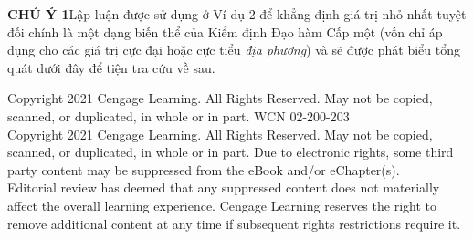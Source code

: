 \documentclass[11pt]{article}
\begin{document}
\begin{minipage}[t]{0.725\textwidth}
  \vspace{16pt}
  \noindent
  \textbf{\textsf{\color{stewartcyan}CHÚ Ý 1}}\quad Lập luận được sử dụng ở Ví dụ 2 để khẳng định giá trị nhỏ nhất tuyệt đối chính là một dạng biến thể của Kiểm định Đạo hàm Cấp một (vốn chỉ áp dụng cho các giá trị cực đại hoặc cực tiểu \textit{địa phương}) và sẽ được phát biểu tổng quát dưới đây để tiện tra cứu về sau.
\end{minipage}

\vfill
\noindent
{\fontsize{6.5}{8}\selectfont \color{stewartdarkgray}
Copyright 2021 Cengage Learning. All Rights Reserved. May not be copied, scanned, or duplicated, in whole or in part. WCN 02-200-203\\
Copyright 2021 Cengage Learning. All Rights Reserved. May not be copied, scanned, or duplicated, in whole or in part. Due to electronic rights, some third party content may be suppressed from the eBook and/or eChapter(s).\\
Editorial review has deemed that any suppressed content does not materially affect the overall learning experience. Cengage Learning reserves the right to remove additional content at any time if subsequent rights restrictions require it.}
\end{document}

